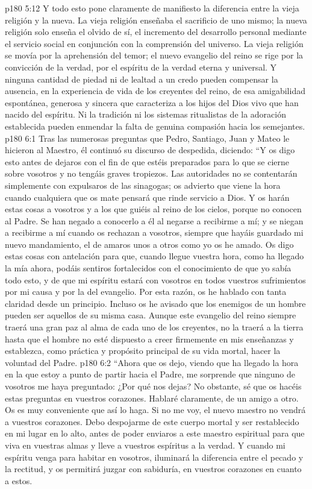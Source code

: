 \vs p180 5:12 Y todo esto pone claramente de manifiesto la diferencia entre la vieja religión y la nueva. La vieja religión enseñaba el sacrificio de uno mismo; la nueva religión solo enseña el olvido de sí, el incremento del desarrollo personal mediante el servicio social en conjunción con la comprensión del universo. La vieja religión se movía por la aprehensión del temor; el nuevo evangelio del reino se rige por la convicción de la verdad, por el espíritu de la verdad eterna y universal. Y ninguna cantidad de piedad ni de lealtad a un credo pueden compensar la ausencia, en la experiencia de vida de los creyentes del reino, de esa amigabilidad espontánea, generosa y sincera que caracteriza a los hijos del Dios vivo que han nacido del espíritu. Ni la tradición ni los sistemas ritualistas de la adoración establecida pueden enmendar la falta de genuina compasión hacia los semejantes.
\vs p180 6:1 Tras las numerosas preguntas que Pedro, Santiago, Juan y Mateo le hicieron al Maestro, él continuó su discurso de despedida, diciendo: “Y os digo esto antes de dejaros con el fin de que estéis preparados para lo que se cierne sobre vosotros y no tengáis graves tropiezos. Las autoridades no se contentarán simplemente con expulsaros de las sinagogas; os advierto que viene la hora cuando cualquiera que os mate pensará que rinde servicio a Dios. Y os harán estas cosas a vosotros y a los que guiéis al reino de los cielos, porque no conocen al Padre. Se han negado a conocerlo a él al negarse a recibirme a mí; y se niegan a recibirme a mí cuando os rechazan a vosotros, siempre que hayáis guardado mi nuevo mandamiento, el de amaros unos a otros como yo os he amado. Os digo estas cosas con antelación para que, cuando llegue vuestra hora, como ha llegado la mía ahora, podáis sentiros fortalecidos con el conocimiento de que yo sabía todo esto, y de que mi espíritu estará con vosotros en todos vuestros sufrimientos por mi causa y por la del evangelio. Por esta razón, os he hablado con tanta claridad desde un principio. Incluso os he avisado que los enemigos de un hombre pueden ser aquellos de su misma casa. Aunque este evangelio del reino siempre traerá una gran paz al alma de cada uno de los creyentes, no la traerá a la tierra hasta que el hombre no esté dispuesto a creer firmemente en mis enseñanzas y establezca, como práctica y propósito principal de su vida mortal, hacer la voluntad del Padre.
\vs p180 6:2 “Ahora que os dejo, viendo que ha llegado la hora en la que estoy a punto de partir hacia el Padre, me sorprende que ninguno de vosotros me haya preguntado: ¿Por qué nos dejas? No obstante, sé que os hacéis estas preguntas en vuestros corazones. Hablaré claramente, de un amigo a otro. Os es muy conveniente que así lo haga. Si no me voy, el nuevo maestro no vendrá a vuestros corazones. Debo despojarme de este cuerpo mortal y ser restablecido en mi lugar en lo alto, antes de poder enviaros a este maestro espiritual para que viva en vuestras almas y lleve a vuestros espíritus a la verdad. Y cuando mi espíritu venga para habitar en vosotros, iluminará la diferencia entre el pecado y la rectitud, y os permitirá juzgar con sabiduría, en vuestros corazones en cuanto a estos.
